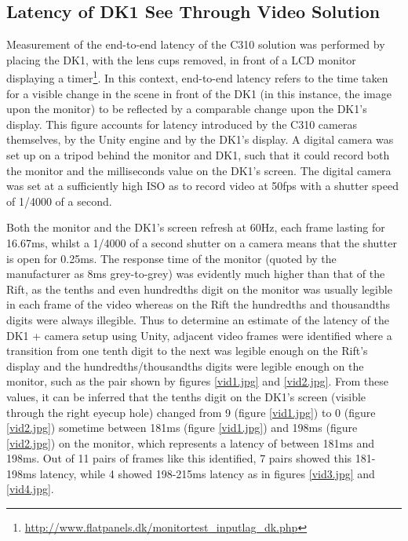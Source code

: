 
\subsection{Latency of DK1 See Through Video Solution}

Measurement of the end-to-end latency of the C310 solution was performed by placing the DK1, with the lens cups removed, in front of a LCD monitor displaying a timer\footnote{\url{http://www.flatpanels.dk/monitortest_inputlag_dk.php}}. In this context, end-to-end latency refers to the time taken for a visible change in the scene in front of the DK1 (in this instance, the image upon the monitor) to be reflected by a comparable change upon the DK1's display. This figure accounts for latency introduced by the C310 cameras themselves, by the Unity engine and by the DK1's display. A digital camera was set up on a tripod behind the monitor and DK1, such that it could record both the monitor and the milliseconds value on the DK1's screen. The digital camera was set at a sufficiently high ISO as to record video at 50fps with a shutter speed of 1/4000 of a second.

Both the monitor and the DK1's screen refresh at 60Hz, each frame lasting for 16.67ms, whilst a 1/4000 of a second shutter on a camera means that the shutter is open for 0.25ms. The response time of the monitor (quoted by the manufacturer as 8ms grey-to-grey) was evidently much higher than that of the Rift, as the tenths and even hundredths digit on the monitor was usually legible in each frame of the video whereas on the Rift the hundredths and thousandths digits were always illegible. Thus to determine an estimate of the latency of the DK1 + camera setup using Unity, adjacent video frames were identified where a transition from one tenth digit to the next was legible enough on the Rift's display and the hundredths/thousandths digits were legible enough on the monitor, such as the pair shown by figures \ref{vid1.jpg} and \ref{vid2.jpg}. From these values, it can be inferred that the tenths digit on the DK1's screen (visible through the right eyecup hole) changed from 9 (figure \ref{vid1.jpg}) to 0 (figure \ref{vid2.jpg}) sometime between 181ms (figure \ref{vid1.jpg}) and 198ms (figure \ref{vid2.jpg}) on the monitor, which represents a latency of between 181ms and 198ms. Out of 11 pairs of frames like this identified, 7 pairs showed this 181-198ms latency, while 4 showed 198-215ms latency as in figures \ref{vid3.jpg} and \ref{vid4.jpg}.

